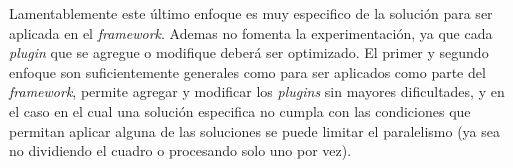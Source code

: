 Lamentablemente este último enfoque es muy especifico de la solución para ser
aplicada en el \emph{framework}. Ademas no fomenta la experimentación, ya que
cada \emph{plugin} que se agregue o modifique deberá ser optimizado. El primer y
segundo enfoque son suficientemente generales como para ser aplicados como parte
del \emph{framework}, permite agregar y modificar los \emph{plugins} sin mayores
dificultades, y en el caso en el cual una solución especifica no cumpla con las
condiciones que permitan aplicar alguna de las soluciones se puede limitar el
paralelismo (ya sea no dividiendo el cuadro o procesando solo uno por vez).
